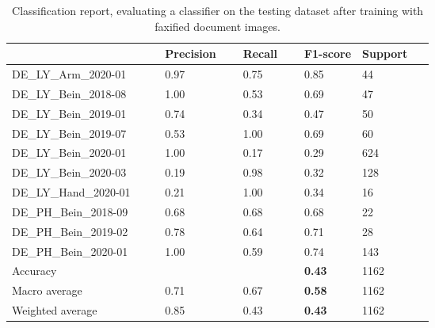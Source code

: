 \begin{center}
\begin{table}[H]
    \begin{center}
    \begin{tabular}{P{0.22\linewidth} P{0.10\linewidth} P{0.10\linewidth} P{0.10\linewidth} P{0.10\linewidth}} 
        \toprule
            & Precision & Recall & F1-score & Support\\[0.0ex] 
        \midrule
        DE\_LY\_Arm\_2020-01 & 0.97 & 0.75 & 0.85 & 44\\[0.0ex]
        \midrule
        DE\_LY\_Bein\_2018-08 & 1.00 & 0.53 & 0.69 & 47\\[0.0ex]
        \midrule
        DE\_LY\_Bein\_2019-01 & 0.74 & 0.34 & 0.47 & 50\\[0.0ex]
        \midrule
        DE\_LY\_Bein\_2019-07 & 0.53 & 1.00 & 0.69 & 60\\[0.0ex]
        \midrule
        DE\_LY\_Bein\_2020-01 & 1.00 & 0.17 & 0.29 & 624\\[0.0ex]
        \midrule
        DE\_LY\_Bein\_2020-03 & 0.19 & 0.98 & 0.32 & 128\\[0.0ex]
        \midrule
        DE\_LY\_Hand\_2020-01 & 0.21 & 1.00 & 0.34 & 16\\[0.0ex]
        \midrule
        DE\_PH\_Bein\_2018-09 & 0.68 & 0.68 & 0.68 & 22\\[0.0ex]
        \midrule
        DE\_PH\_Bein\_2019-02 & 0.78 & 0.64 & 0.71 & 28\\[0.0ex]
        \midrule
        DE\_PH\_Bein\_2020-01 & 1.00 & 0.59 & 0.74 & 143\\[0.0ex]
        \midrule
        \midrule
        Accuracy              &      &      & \bf{0.43} & 1162\\[0.0ex]
        Macro average             & 0.71 & 0.67 & \bf{0.58} & 1162\\[0.0ex]
        Weighted average          & 0.85 & 0.43 & \bf{0.43} & 1162\\[0.0ex]

        \bottomrule
    \end{tabular}
    \caption[Classification report, evaluating a classifier on the testing dataset after training with faxified document images.]{Classification report, evaluating a classifier on the testing dataset after training with faxified document images.}
    \label{table:FaxifiedClassificationReport}
    \end{center}
\end{table}
\end{center}



